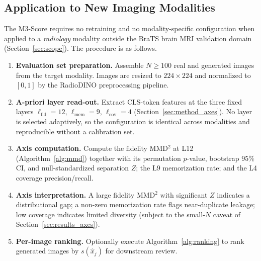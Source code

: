 \documentclass[lettersize,journal]{IEEEtran}
\begin{document}
\subsection{Application to New Imaging Modalities}
\label{sec:method_deployment}

The M3-Score requires no retraining and no modality-specific
configuration when applied to a \emph{radiology} modality outside the BraTS
brain MRI validation domain (Section~\ref{sec:scope}).
The procedure is as follows.

\begin{enumerate}[leftmargin=*,label=\arabic*.,itemsep=0.3em]

  \item \textbf{Evaluation set preparation.}
        Assemble $N \geq 100$ real and generated images from the
        target modality.
        Images are resized to $224 \times 224$ and normalized to
        $[0, 1]$ by the RadioDINO preprocessing pipeline.

  \item \textbf{A-priori layer read-out.}
        Extract CLS-token features at the three fixed layers
        $\ell_{\text{fid}} = 12$, $\ell_{\text{mem}} = 9$,
        $\ell_{\text{cov}} = 4$ (Section~\ref{sec:method_axes}). No
        layer is selected adaptively, so the configuration is identical
        across modalities and reproducible without a calibration set.

  \item \textbf{Axis computation.}
        Compute the fidelity MMD$^2$ at L12
        (Algorithm~\ref{alg:mmd}) together with its permutation
        $p$-value, bootstrap $95\%$ CI, and null-standardized separation $Z$; the L9
        memorization rate; and the L4 coverage precision/recall.

  \item \textbf{Axis interpretation.}
        A large fidelity MMD$^2$ with significant $Z$ indicates a
        distributional gap; a non-zero memorization rate flags
        near-duplicate leakage; low coverage indicates limited diversity
        (subject to the small-$N$ caveat of
        Section~\ref{sec:results_axes}).

  \item \textbf{Per-image ranking.}
        Optionally execute Algorithm~\ref{alg:ranking} to rank generated
        images by $s(\hat{x}_j)$ for downstream review.

\end{enumerate}
\end{document}
